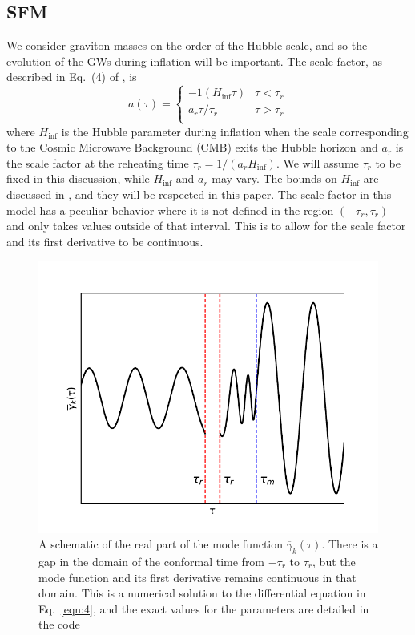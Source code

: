 \documentclass[prd,twocolumn,aps,psfig,nofootinbib,nobibnotes,superscriptaddress,preprintnumbers,times]{revtex4-2}
\begin{document}
\subsection{SFM}
We consider graviton masses on the order of the Hubble scale, and so the evolution of the GWs during inflation will be important.
The scale factor, as described in Eq.\ (4) of \cite{Fujita:2018}, is
\begin{equation}
    a(\tau) = 
    \begin{cases}
            -1(H_{\inf}\tau) & \tau < \tau_r \\
            a_r \tau/\tau_r & \tau > \tau_r \\
   \end{cases}
   \label{eqn:6} 
\end{equation}
where $H_{\inf}$ is the Hubble parameter during inflation when the scale corresponding to the Cosmic Microwave Background (CMB) exits the Hubble horizon and $a_r$ is the scale factor at the reheating time $\tau_r = 1/(a_r H_{\inf})$. We will assume $\tau_r$ to be fixed in this discussion, while $H_{\inf}$ and $a_r$ may vary. The bounds on $H_{\inf}$ are discussed in \cite{Jiang:2017}, and they will be respected in this paper. The scale factor in this model has a peculiar behavior where it is not defined in the region $(-\tau_r, \tau_r)$ and only takes values outside of that interval. This is to allow for the scale factor and its first derivative to be continuous. 
\begin{figure}[h]
\includegraphics[scale=0.65]{fig/fig0.pdf}
\caption{A schematic of the real part of the mode function $\overline{\gamma}_k(\tau)$. There is a gap in the domain of the conformal time from $-\tau_r$ to $\tau_r$, but the mode function and its first derivative remains continuous in that domain. This is a numerical solution to the differential equation in Eq.\ \ref{eqn:4}, and the exact values for the parameters are detailed in the code \cite{GH}}
\label{fig:mode}
\end{figure}
\end{document}

